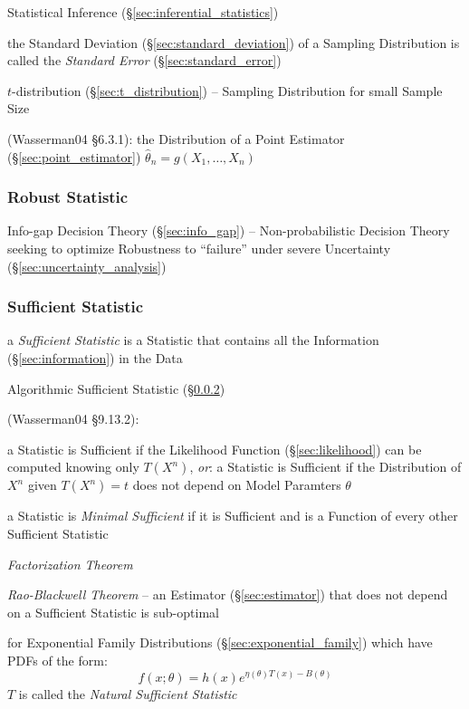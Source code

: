 Statistical Inference (\S\ref{sec:inferential_statistics})

the Standard Deviation (\S\ref{sec:standard_deviation}) of a Sampling
Distribution is called the \emph{Standard Error} (\S\ref{sec:standard_error})

$t$-distribution (\S\ref{sec:t_distribution}) -- Sampling Distribution for small
Sample Size

(Wasserman04 \S6.3.1):
the Distribution of a Point Estimator (\S\ref{sec:point_estimator})
$\hat{\theta}_n = g(X_1,\ldots,X_n)$



\subsubsection{Robust Statistic}\label{sec:robust_statistic}

\fist Info-gap Decision Theory (\S\ref{sec:info_gap}) -- Non-probabilistic
Decision Theory seeking to optimize Robustness to ``failure'' under severe
Uncertainty (\S\ref{sec:uncertainty_analysis})



\subsubsection{Sufficient Statistic}\label{sec:sufficient_statistic}

a \emph{Sufficient Statistic} is a Statistic that contains all the Information
(\S\ref{sec:information}) in the Data

\fist Algorithmic Sufficient Statistic (\S\ref{sec:sufficient_statistic})

(Wasserman04 \S9.13.2):

a Statistic is Sufficient if the Likelihood Function (\S\ref{sec:likelihood})
can be computed knowing only $T(X^n)$,
\emph{or}: a Statistic is Sufficient if the Distribution of $X^n$ given
$T(X^n) = t$ does not depend on Model Paramters $\theta$

a Statistic is \emph{Minimal Sufficient} if it is Sufficient and is a Function
of every other Sufficient Statistic

\emph{Factorization Theorem}

\emph{Rao-Blackwell Theorem} -- an Estimator (\S\ref{sec:estimator}) that does
not depend on a Sufficient Statistic is sub-optimal

for Exponential Family Distributions (\S\ref{sec:exponential_family}) which have
PDFs of the form:
\[
  f(x; \theta) = h(x) e^{\eta(\theta)T(x) - B(\theta)}
\]
$T$ is called the \emph{Natural Sufficient Statistic}

